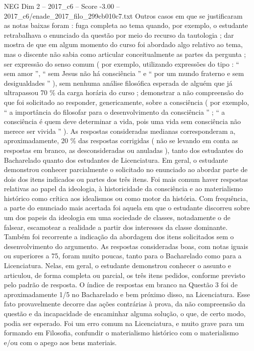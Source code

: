 \begin{textsample}{NEG Dim 2 – 2017\_c6 – Score -3.00 – 2017\_c6/enade\_2017\_filo\_299cb010c7.txt}
Outros casos em que se justificaram as notas baixas foram : fuga completa ao tema quando, por exemplo, o estudante retrabalhava o enunciado da questão por meio do recurso da tautologia ; dar mostra de que em algum momento do curso foi abordado algo relativo ao tema, mas o discente não sabia como articular conceitualmente as partes da pergunta ; ser expressão do senso comum ( por exemplo, utilizando expressões do tipo : “ sem amor ”, “ sem Jesus não há consciência ” e “ por um mundo fraterno e sem desigualdades ” ), sem nenhuma análise filosófica esperada de alguém que já ultrapassou 70 \% da carga horária do curso ; demonstrar a não compreensão do que foi solicitado ao responder, genericamente, sobre a consciência ( por exemplo, “ a importância do filosofar para o desenvolvimento da consciência ” ; “ a consciência é quem deve determinar a vida, pois uma vida sem consciência não merece ser vivida ” ).
As respostas consideradas medianas corresponderam a, aproximadamente, 20 \% das respostas corrigidas ( não se levando em conta as respostas em branco, as desconsideradas ou anuladas ), tanto dos estudantes do Bacharelado quanto dos estudantes de Licenciatura.
Em geral, o estudante demonstrou conhecer parcialmente o solicitado no enunciado ao abordar parte de dois dos itens indicados ou partes dos três itens.
Foi mais comum haver respostas relativas ao papel da ideologia, à historicidade da consciência e ao materialismo histórico como crítica aos idealismos ou como motor da história.
Com frequência, a parte do enunciado mais acertada foi aquela em que o estudante discorreu sobre um dos papeis da ideologia em uma sociedade de classes, notadamente o de falsear, escamotear a realidade a partir dos interesses da classe dominante.
Também foi recorrente a indicação da abordagem dos itens solicitados sem o desenvolvimento do argumento.
As respostas consideradas boas, com notas iguais ou superiores a 75, foram muito poucas, tanto para o Bacharelado como para a Licenciatura.
Nelas, em geral, o estudante demonstrou conhecer o assunto e articulou, de forma completa ou parcial, os três itens pedidos, conforme previsto pelo padrão de resposta.
O índice de respostas em branco na Questão 3 foi de aproximadamente 1/5 no Bacharelado e bem próximo disso, na Licenciatura.
Esse fato provavelmente decorre das ações contrárias à prova, da não compreensão da questão e da incapacidade de encaminhar alguma solução, o que, de certo modo, podia ser esperado.
Foi um erro comum na Licenciatura, e muito grave para um formando em Filosofia, confundir o materialismo histórico com o materialismo e/ou com o apego aos bens materiais.

\end{textsample}
